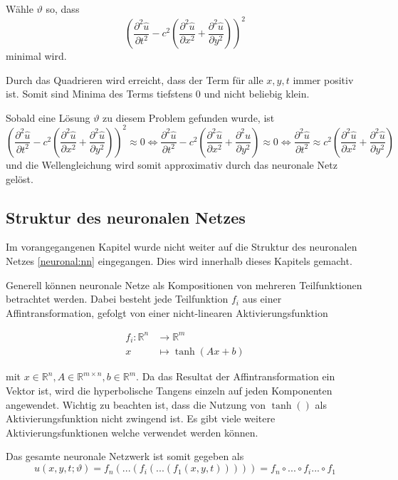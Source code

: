Wähle \( \vartheta \) so, dass
\begin{equation}
    \left(\frac{\partial^2 \hat{u}}{\partial t^2} - c^2 \left( \frac{\partial^2 \hat{u}}{\partial x^2} + \frac{\partial^2 \hat{u}}{\partial y^2} \right)\right)^2
    \label{neuronal:optimierung}
\end{equation}
minimal wird.\newline

Durch das Quadrieren wird erreicht, dass der Term für alle \( x, y, t \) immer positiv ist.
Somit sind Minima des Terms tiefstens 0 und nicht beliebig klein.

Sobald eine Lösung \( \vartheta \) zu diesem Problem gefunden wurde, ist
\begin{equation}
    \left(\frac{\partial^2 \hat{u}}{\partial t^2} - c^2 \left( \frac{\partial^2 \hat{u}}{\partial x^2} + \frac{\partial^2 \hat{u}}{\partial y^2} \right)\right)^2 \approx 0
    \iff
    \frac{\partial^2 \hat{u}}{\partial t^2} - c^2 \left( \frac{\partial^2 \hat{u}}{\partial x^2} + \frac{\partial^2 \hat{u}}{\partial y^2} \right) \approx 0
    \iff
    \frac{\partial^2 \hat{u}}{\partial t^2} \approx c^2 \left( \frac{\partial^2 \hat{u}}{\partial x^2} + \frac{\partial^2 \hat{u}}{\partial y^2} \right)
\end{equation}
und die Wellengleichung wird somit approximativ durch das neuronale Netz gelöst.


\subsection{Struktur des neuronalen Netzes}\label{neuronal:subsection:struktur_nn}

Im vorangegangenen Kapitel wurde nicht weiter auf die Struktur des neuronalen Netzes \eqref{neuronal:nn} eingegangen.
Dies wird innerhalb dieses Kapitels gemacht.

Generell können neuronale Netze als Kompositionen von mehreren Teilfunktionen betrachtet werden.
Dabei besteht jede Teilfunktion \( f_i \) aus einer Affintransformation, gefolgt von einer nicht-linearen Aktivierungsfunktion

\begin{align*}
    f_i\colon \mathbb{R}^n & \longrightarrow\mathbb{R}^m \\[-1ex]
    x & \longmapsto \tanh(Ax + b)
\end{align*}

mit \( x \in \mathbb{R}^n, A \in \mathbb{R}^{m \times n}, b \in \mathbb{R}^m \). 
Da das Resultat der Affintransformation ein Vektor ist, wird die hyperbolische Tangens einzeln auf jeden Komponenten angewendet.
Wichtig zu beachten ist, dass die Nutzung von \( \tanh() \) als Aktivierungsfunktion nicht zwingend ist.
Es gibt viele weitere Aktivierungsfunktionen welche verwendet werden können. 

Das gesamte neuronale Netzwerk ist somit gegeben als
\begin{equation}
    \hat{u}(x, y, t; \vartheta) = f_n(...(f_i(...(f_1(x, y, t))))) = f_n \circ ... \circ f_i ... \circ f_1
\end{equation}

